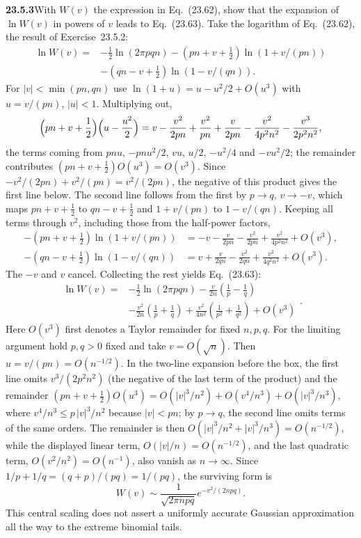 \par\bigskip
\noindent\textbf{23.5.3}\quad With $W(v)$ the expression in
Eq.~(23.62), show that the expansion of $\ln W(v)$ in powers of
$v$ leads to Eq.~(23.63).
\solution
Take the logarithm of Eq.~(23.62), the result of Exercise~23.5.2:
\begin{align*}
\ln W(v)={}&-\tfrac12\ln(2\pi pqn)
 -(pn+v+\tfrac12)\ln(1+v/(pn))\\
 &-(qn-v+\tfrac12)\ln(1-v/(qn)).
\end{align*}
For $|v|<\min(pn,qn)$ use $\ln(1+u)=u-u^2/2+O(u^3)$ with
$u=v/(pn)$, $|u|<1$. Multiplying out,
\[
\Bigl(pn+v+\frac12\Bigr)\Bigl(u-\frac{u^2}2\Bigr)
=v-\frac{v^2}{2pn}+\frac{v^2}{pn}+\frac v{2pn}-\frac{v^2}{4p^2n^2}
-\frac{v^3}{2p^2n^2},
\]
the terms coming from $pnu$, $-pnu^2/2$, $vu$, $u/2$, $-u^2/4$ and
$-vu^2/2$; the remainder contributes $(pn+v+\frac12)O(u^3)=O(v^3)$.
Since $-v^2/(2pn)+v^2/(pn)=v^2/(2pn)$, the negative of this product
gives the first line below. The second line follows from the first by
$p\to q$, $v\to-v$, which maps $pn+v+\frac12$ to $qn-v+\frac12$ and
$1+v/(pn)$ to $1-v/(qn)$. Keeping all terms through $v^2$, including
those from the half-power factors,
\begin{align*}
-(pn+v+\tfrac12)\ln(1+v/(pn))
&=-v-\frac{v}{2pn}-\frac{v^2}{2pn}+\frac{v^2}{4p^2n^2}+O(v^3),\\
-(qn-v+\tfrac12)\ln(1-v/(qn))
&=v+\frac{v}{2qn}-\frac{v^2}{2qn}+\frac{v^2}{4q^2n^2}+O(v^3).
\end{align*}
The $-v$ and $v$ cancel. Collecting the rest yields Eq.~(23.63):
\[
\boxed{\begin{aligned}
\ln W(v)={}&-\tfrac12\ln(2\pi pqn)
 -\frac{v}{2n}\left(\frac1p-\frac1q\right)\\
 &-\frac{v^2}{2n}\left(\frac1p+\frac1q\right)
 +\frac{v^2}{4n^2}\left(\frac1{p^2}+\frac1{q^2}\right)+O(v^3)
\end{aligned}}.
\]
Here $O(v^3)$ first denotes a Taylor remainder for fixed $n,p,q$.
For the limiting argument hold $p,q>0$ fixed and take $v=O(\sqrt n)$.
Then $u=v/(pn)=O(n^{-1/2})$. In the two-line expansion before the box,
the first line omits $v^3/(2p^2n^2)$ (the negative of the last term of
the product) and the remainder
$(pn+v+\frac12)O(u^3)=O(|v|^3/n^2)+O(v^4/n^3)+O(|v|^3/n^3)$, where
$v^4/n^3\le p\,|v|^3/n^2$ because $|v|<pn$; by $p\to q$, the second
line omits terms of the same orders.
The remainder is then $O(|v|^3/n^2+|v|^3/n^3)=O(n^{-1/2})$,
while the displayed linear term, $O(|v|/n)=O(n^{-1/2})$, and the last
quadratic term, $O(v^2/n^2)=O(n^{-1})$, also vanish as $n\to\infty$.
Since $1/p+1/q=(q+p)/(pq)=1/(pq)$, the surviving form is
\[
W(v)\sim\frac1{\sqrt{2\pi npq}}e^{-v^2/(2npq)}.
\]
This central scaling does not assert a uniformly accurate Gaussian
approximation all the way to the extreme binomial tails.


